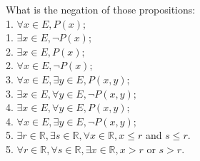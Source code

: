 \documentclass{article}
\begin{document}
\noindent What is the negation of those propositions:\\
1. $\forall x \in E, P(x);$\\
1. $ \exists x \in E, \neg P(x);$\\
2. $\exists x \in E, P(x);$\\
2. $\forall x \in E, \neg P(x);$\\
3. $\forall x \in E, \exists y \in E, P(x,y);$\\
3. $\exists x \in E, \forall y \in E, \neg P(x,y);$\\
4. $\exists x \in E, \forall y \in E, P(x,y);$\\
4. $\forall x \in E, \exists y \in E, \neg P(x,y);$\\
5. $\exists r \in \mathbb{R}, \exists s \in \mathbb{R},
\forall x \in \mathbb{R}, x \leq r $ and
$s \leq r$.\\
5. $\forall r \in \mathbb{R}, \forall s \in \mathbb{R},
\exists x \in \mathbb{R}, x > r $ or
$s > r$.\\
\end{document}
